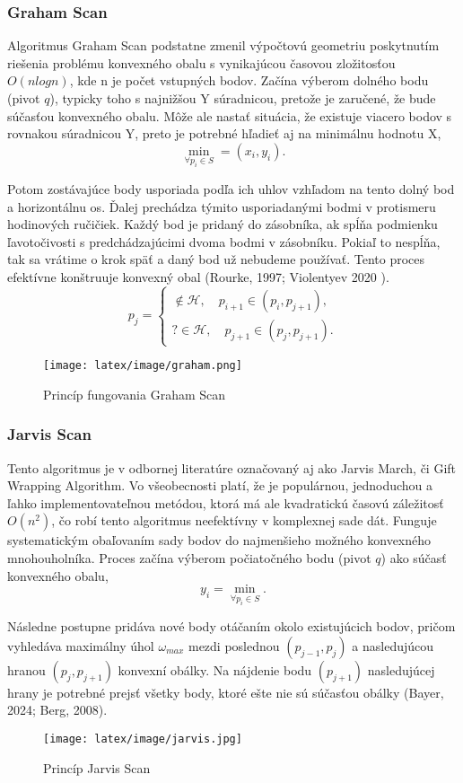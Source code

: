 \documentclass[12pt]{article}
\begin{document}
\subsubsection*{Graham Scan}
Algoritmus Graham Scan podstatne zmenil výpočtovú geometriu poskytnutím riešenia problému konvexného obalu s vynikajúcou časovou zložitosťou \(O(n log n)\), kde n je počet vstupných bodov. Začína výberom dolného bodu (pivot \(q\)), typicky toho s najnižšou Y súradnicou, pretože je zaručené, že bude súčasťou konvexného obalu. Môže ale nastať situácia, že existuje viacero bodov s rovnakou súradnicou Y, preto je potrebné hľadieť aj na minimálnu hodnotu X, $$\min\limits_{\forall p_i \in S} = (x_i,y_i).$$
\par Potom zostávajúce body usporiada podľa ich uhlov vzhľadom na tento dolný bod a horizontálnu os. Ďalej prechádza týmito usporiadanými bodmi v protismeru hodinových ručičiek. Každý bod je pridaný do zásobníka, ak spĺňa podmienku ľavotočivosti s predchádzajúcimi dvoma bodmi v zásobníku. Pokiaľ to nespĺňa, tak sa vrátime o krok späť a daný bod už nebudeme používať. Tento proces efektívne konštruuje konvexný obal (Rourke, 1997; Violentyev 2020 ).  \\
\begin{equation}\nonumber
    p_j=
    \begin{cases}
    \notin \mathcal{H}, \quad p_{i+1} \in (p_i, p_{j+1}), \\
    ? \in \mathcal{H}, \quad p_{j+1} \in (p_j, p_{j+1}).
    \end{cases}
\end{equation}


\begin{figure}[h]
    \centering
    \texttt{[image: latex/image/graham.png]}
    \caption{Princíp fungovania Graham Scan}
    \label{fig:enter-label}
\end{figure}

\subsubsection*{Jarvis Scan}
Tento algoritmus je v odbornej literatúre označovaný aj ako Jarvis March, či Gift Wrapping Algorithm. Vo všeobecnosti platí, že je populárnou, jednoduchou a ľahko implementovateľnou metódou, ktorá má ale kvadratickú časovú záležitosť \(O(n^2)\), čo robí tento algoritmus neefektívny v komplexnej sade dát. Funguje systematickým obaľovaním sady bodov do najmenšieho možného konvexného mnohouholníka. Proces začína výberom počiatočného bodu (pivot \(q\)) ako súčasť konvexného obalu, $$ y_i=\min\limits_{\forall p_i \in S} .$$ \par Následne postupne pridáva nové body otáčaním okolo existujúcich bodov, pričom vyhledáva maximálny úhol \(\omega_{max}\) mezdi poslednou \((p_{j-1}, p_j)\) a nasledujúcou hranou \((p_j, p_{j+1})\) konvexní obálky. Na nájdenie bodu  \((p_{j+1})\) nasledujúcej hrany je potrebné prejsť všetky body, ktoré ešte nie sú súčasťou obálky (Bayer, 2024; Berg, 2008).
\begin{figure}[h]
    \centering
    \texttt{[image: latex/image/jarvis.jpg]}
    \caption{Princíp Jarvis Scan}
    \label{fig:enter-label}
\end{figure}
\end{document}
